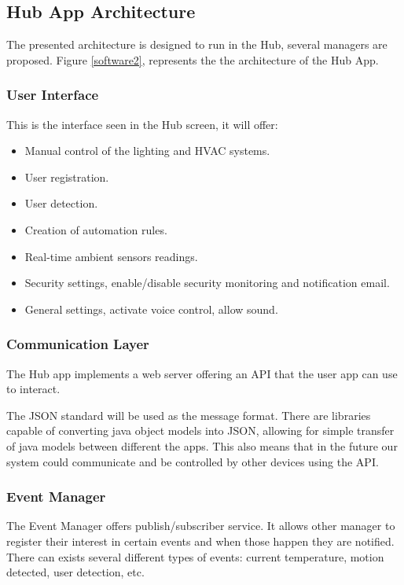 \subsection{Hub App Architecture}

The presented architecture is designed to run in the Hub, several managers are proposed. Figure \ref{software2}, represents the the architecture of the Hub App.

\subsubsection{User Interface}
This is the interface seen in the Hub screen, it will offer:

\begin{itemize}
  \item Manual control of the lighting and HVAC systems.
  \item User registration.
  \item User detection.
  \item Creation of automation rules.
  \item Real-time ambient sensors readings.
  \item Security settings, enable/disable security monitoring and notification email.
  \item General settings, activate voice control, allow sound.
   
\end{itemize}

\subsubsection{Communication Layer}

The Hub app implements a web server offering an \ac{API} that the user app can use to interact. 

The \ac{JSON} standard will be used as the message format. There are libraries capable of converting java object models into JSON, allowing for simple transfer of java models between different the apps. This also means that in the future our system could communicate and be controlled by other devices using the \ac{API}.

\subsubsection{Event Manager}
The Event Manager offers publish/subscriber service. It allows other manager to register their interest in certain events and when those happen they are notified. There can exists several different types of events: current temperature, motion detected, user detection, etc.

